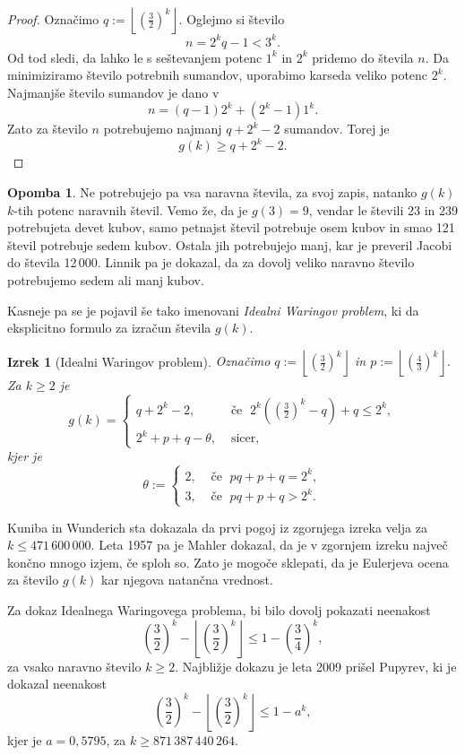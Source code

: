 \documentclass[a4paper]{amsart}
\theoremstyle{definition}
\newtheorem{opomba}[definicija]{Opomba}
\theoremstyle{plain}
\newtheorem{izrek}[definicija]{Izrek}
\numberwithin{equation}{section}
\begin{document}
\begin{proof}
	Označimo  $q:=\left\lfloor \left(\frac{3}{2}\right)^k\right\rfloor$. Oglejmo si število $$n=2^k q - 1 <  3^k.$$ Od tod sledi, da lahko le s seštevanjem potenc $1^k$ in $2^k$ pridemo do števila $n$. Da minimiziramo število potrebnih sumandov, uporabimo karseda veliko potenc $2^k$. Najmanjše število sumandov je dano v
	 $$n=(q-1)2^k + (2^k-1)1^k.$$ Zato za število $n$ potrebujemo najmanj $q+2^k-2$ sumandov. Torej je $$g(k)\geqslant q + 2^k -2.$$	
\end{proof}

\begin{opomba}
	Ne potrebujejo pa vsa naravna števila, za svoj zapis, natanko $g(k)$ $k$-tih potenc naravnih števil. Vemo že, da je $g(3)=9$, vendar le števili 23 in 239 potrebujeta devet kubov, samo petnajst števil potrebuje osem kubov in smao 121 števil potrebuje sedem kubov. Ostala jih potrebujejo manj, kar je preveril Jacobi do števila 12\,000. Linnik pa je dokazal, da za dovolj veliko naravno število potrebujemo sedem ali manj kubov.
\end{opomba}

Kasneje pa se je pojavil še tako imenovani \emph{Idealni Waringov problem}, ki da eksplicitno formulo za izračun števila $g(k)$.

\begin{izrek}[Idealni Waringov problem]
	Označimo $q:=\left\lfloor \left(\frac{3}{2}\right)^k\right\rfloor$ in $p:=\left\lfloor\left(\frac{4}{3}\right)^k\right\rfloor$. Za $k\geqslant 2$ je $$g(k)= 
	  \begin{cases}
		q + 2^k - 2, & \text{ če }\; 2^k \left(\left(\frac{3}{2}\right)^k - q\right) + q \leqslant 2^k, \\
		2^k + p +q - \theta, & \text{ sicer},
	  \end{cases}$$ 
	kjer je $$\theta := 
	  \begin{cases} 
		2, & \text{ če }\; pq + p +q = 2^k,\\
		3, & \text{ če }\; pq + p + q > 2^k.
	  \end{cases}$$
\end{izrek}

Kuniba in Wunderich sta dokazala da prvi pogoj iz zgornjega izreka velja za $k\leqslant 471\,600\,000$. Leta 1957 pa je Mahler dokazal, da je v zgornjem izreku največ končno mnogo izjem, če sploh so. Zato je mogoče sklepati, da je Eulerjeva ocena za število $g(k)$ kar njegova natančna vrednost.

Za dokaz Idealnega Waringovega problema, bi bilo dovolj pokazati neenakost 
$$\left(\frac{3}{2}\right)^k - \left\lfloor \left( \frac{3}{2}\right)^k \right\rfloor \leqslant 1-\left(\frac{3}{4}\right)^k,$$ za vsako naravno število $k\geqslant 2$. Najbližje dokazu je leta 2009 prišel Pupyrev, ki je dokazal neenakost $$\left(\frac{3}{2}\right)^k - \left\lfloor \left( \frac{3}{2}\right)^k \right\rfloor \leqslant 1-a^k,$$ kjer je $a=0,5795$, za $k\geqslant 871\, 387\, 440\, 264$.
\end{document}
